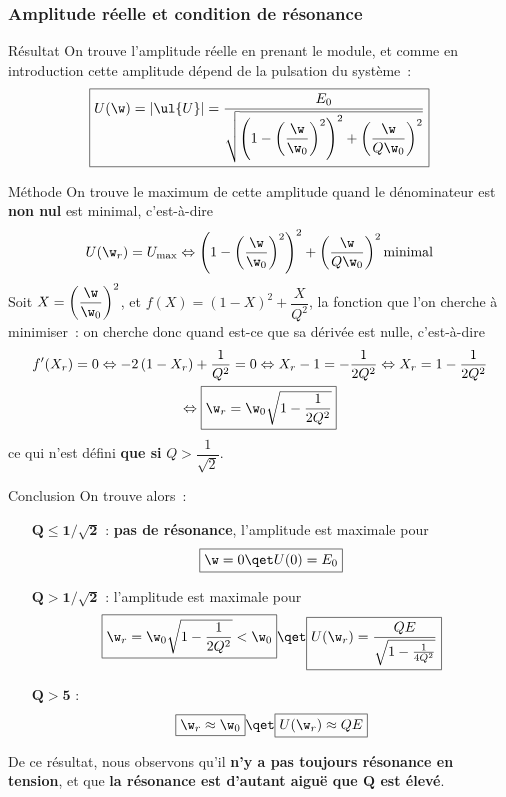 \documentclass[../main/main.tex]{subfiles}
\begin{document}
\subsubsection{Amplitude réelle et condition de résonance}
\begin{rprop}{Résultat}
    On trouve l'amplitude réelle en prenant le module, et comme en introduction
    cette amplitude dépend de la pulsation du système~:
    \[\boxed{
            U(\w)
            = \left| \ul{U} \right|
            = \frac{E_0}{
                \sqrt{\left( 1 - \left(\dfrac{\w}{\w_0}\right)^2 \right)^2
                + \left(\dfrac{\w}{Q\w_0}\right)^2}}
    }\]
\end{rprop}
\begin{rdemo}{Méthode}
    On trouve le maximum de cette amplitude quand le dénominateur est
    \textbf{non nul} est minimal, c'est-à-dire
    \begin{gather*}
        U(\w_r) = U_{\max}
        \Leftrightarrow
        \left( 1 - \left(\dfrac{\w}{\w_0}\right)^2 \right)^2
                + \left(\dfrac{\w}{Q\w_0}\right)^2 \text{minimal}
    \end{gather*}
    Soit $X = \left( \dfrac{\w}{\w_0} \right)^2$, et $f(X) = \left(1 - X\right)^2
    + \dfrac{X}{Q^2}$, la fonction que l'on cherche à minimiser~: on cherche donc
    quand est-ce que sa dérivée est nulle, c'est-à-dire
    \begin{gather*}
        f'(X_r) = 0
        \Leftrightarrow
        -2 \left( 1-X_r \right) + \frac{1}{Q^2} = 0
        \Leftrightarrow
        X_r-1 = - \frac{1}{2Q^2}
        \Leftrightarrow
        X_r = 1 - \frac{1}{2Q^2}\\
        \Leftrightarrow
        \boxed{
        \w_r = \w_0 \sqrt{1 - \frac{1}{2Q^2}}}
    \end{gather*}
    ce qui n'est défini \textbf{que si} $Q > \dfrac{1}{\sqrt{2}}$.
\end{rdemo}
\begin{rror}{Conclusion}
    On trouve alors~:
    \begin{itemize}[leftmargin=60pt]
        \item[$\mathbf{Q \leq 1/\sqrt{2}}$] : \textbf{pas de résonance},
            l'amplitude est maximale pour
            \[\boxed{\w = 0 \qet U(0) = E_0}\]
        \item[$\mathbf{Q > 1/\sqrt{2}}$] : l'amplitude est maximale pour
            \[\boxed{\w_r = \w_0 \sqrt{1 - \frac{1}{2Q^2}} < \w_0}
                \qet
                \boxed{U(\w_r) = \frac{QE}{\sqrt{1 - \frac{1}{4Q^2}}}}
            \]
        \item[$\mathbf{Q > 5}$] :
            \[\boxed{\w_r \approx \w_0}
                \qet
                \boxed{U(\w_r) \approx QE}
            \]
    \end{itemize}
    De ce résultat, nous observons qu'il \textbf{n'y a pas toujours résonance en
    tension}, et que \textbf{la résonance est d'autant aiguë que $\mathbf{Q}$
    est élevé}.
\end{rror}
\end{document}
